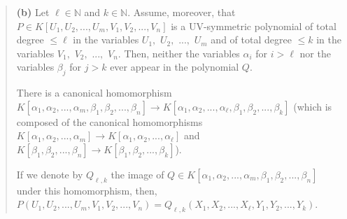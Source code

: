 \documentclass[12pt,final,notitlepage,onecolumn,german]{article}%
\begin{document}
\begin{quote}
\textbf{(b)} Let $\ell\in\mathbb{N}$ and $k\in\mathbb{N}$. Assume, moreover,
that $P\in K\left[  U_{1},U_{2},...,U_{m},V_{1},V_{2},...,V_{n}\right]  $ is a
UV-symmetric polynomial of total degree $\leq\ell$ in the variables $U_{1},$
$U_{2},$ $...,$ $U_{m}$ and of total degree $\leq k$ in the variables $V_{1},$
$V_{2},$ $...,$ $V_{n}.$ Then, neither the variables $\alpha_{i}$ for $i>\ell$
nor the variables $\beta_{j}$ for $j>k$ ever appear in the polynomial $Q$.

There is a canonical homomorphism $K\left[  \alpha_{1},\alpha_{2}%
,...,\alpha_{m},\beta_{1},\beta_{2},...,\beta_{n}\right]  \rightarrow K\left[
\alpha_{1},\alpha_{2},...,\alpha_{\ell},\beta_{1},\beta_{2},...,\beta
_{k}\right]  $ (which is composed of the canonical homomorphisms $K\left[
\alpha_{1},\alpha_{2},...,\alpha_{m}\right]  \rightarrow K\left[  \alpha
_{1},\alpha_{2},...,\alpha_{\ell}\right]  $ and $K\left[  \beta_{1},\beta
_{2},...,\beta_{n}\right]  \rightarrow K\left[  \beta_{1},\beta_{2}%
,...,\beta_{k}\right]  $).

If we denote by $Q_{\ell,k}$ the image of $Q\in K\left[  \alpha_{1},\alpha
_{2},...,\alpha_{m},\beta_{1},\beta_{2},...,\beta_{n}\right]  $ under this
homomorphism, then, $P\left(  U_{1},U_{2},...,U_{m},V_{1},V_{2},...,V_{n}%
\right)  =Q_{\ell,k}\left(  X_{1},X_{2},...,X_{\ell},Y_{1},Y_{2}%
,...,Y_{k}\right)  $.
\end{quote}
\end{document}
